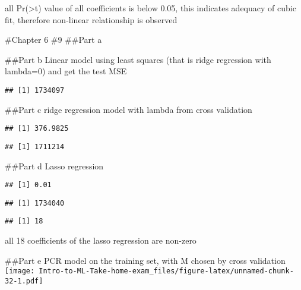 \documentclass[
]{article}
\begin{document}
all Pr(\textgreater\textbar t\textbar) value of all coefficients is
below 0.05, this indicates adequacy of cubic fit, therefore non-linear
relationship is observed

\#Chapter 6 \#9 \#\#Part a

\#\#Part b Linear model using least squares (that is ridge regression
with lambda=0) and get the test MSE

\begin{verbatim}
## [1] 1734097
\end{verbatim}

\#\#Part c ridge regression model with lambda from cross validation

\begin{verbatim}
## [1] 376.9825
\end{verbatim}

\begin{verbatim}
## [1] 1711214
\end{verbatim}

\#\#Part d Lasso regression

\begin{verbatim}
## [1] 0.01
\end{verbatim}

\begin{verbatim}
## [1] 1734040
\end{verbatim}

\begin{verbatim}
## [1] 18
\end{verbatim}

all 18 coefficients of the lasso regression are non-zero

\#\#Part e PCR model on the training set, with M chosen by cross
validation
\texttt{[image: Intro-to-ML-Take-home-exam\_files/figure-latex/unnamed-chunk-32-1.pdf]}
\end{document}
